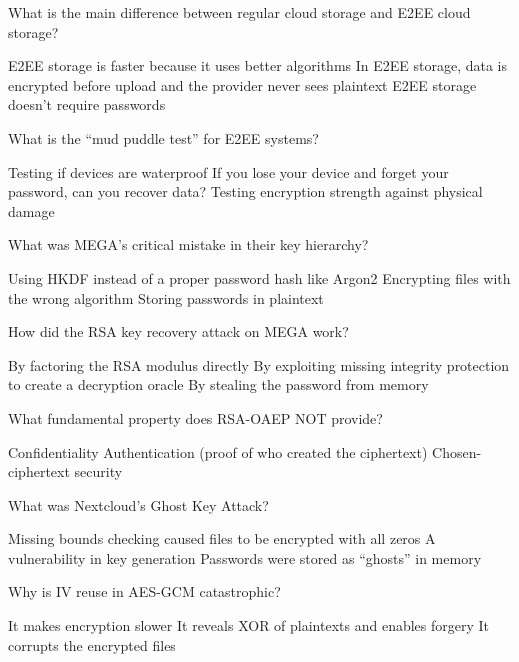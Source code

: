 \documentclass[10pt,a4paper,american]{exam}
\begin{document}
\begin{questions}
	\question What is the main difference between regular cloud storage and E2EE cloud storage?
	\begin{randomizechoices}
		\choice E2EE storage is faster because it uses better algorithms
		\CorrectChoice In E2EE storage, data is encrypted before upload and the provider never sees plaintext
		\choice E2EE storage doesn't require passwords
	\end{randomizechoices}

	\question What is the ``mud puddle test'' for E2EE systems?
	\begin{randomizechoices}
		\choice Testing if devices are waterproof
		\CorrectChoice If you lose your device and forget your password, can you recover data?
		\choice Testing encryption strength against physical damage
	\end{randomizechoices}

	\question What was MEGA's critical mistake in their key hierarchy?
	\begin{randomizechoices}
		\CorrectChoice Using HKDF instead of a proper password hash like Argon2
		\choice Encrypting files with the wrong algorithm
		\choice Storing passwords in plaintext
	\end{randomizechoices}

	\question How did the RSA key recovery attack on MEGA work?
	\begin{randomizechoices}
		\choice By factoring the RSA modulus directly
		\CorrectChoice By exploiting missing integrity protection to create a decryption oracle
		\choice By stealing the password from memory
	\end{randomizechoices}

	\question What fundamental property does RSA-OAEP NOT provide?
	\begin{randomizechoices}
		\choice Confidentiality
		\CorrectChoice Authentication (proof of who created the ciphertext)
		\choice Chosen-ciphertext security
	\end{randomizechoices}

	\question What was Nextcloud's Ghost Key Attack?
	\begin{randomizechoices}
		\CorrectChoice Missing bounds checking caused files to be encrypted with all zeros
		\choice A vulnerability in key generation
		\choice Passwords were stored as ``ghosts'' in memory
	\end{randomizechoices}

	\question Why is IV reuse in AES-GCM catastrophic?
	\begin{randomizechoices}
		\choice It makes encryption slower
		\CorrectChoice It reveals XOR of plaintexts and enables forgery
		\choice It corrupts the encrypted files
	\end{randomizechoices}


\end{questions}
\end{document}
